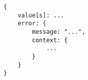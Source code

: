 \begin{lstlisting}[language=numbered,caption={Shape of the \acrshort{api} responses},label=code:api_response_shape,float,floatplacement=H]
{
    value[s]: ...
    error: {
        message: "...",
        context: {
            ...
        }
    }
}
\end{lstlisting}